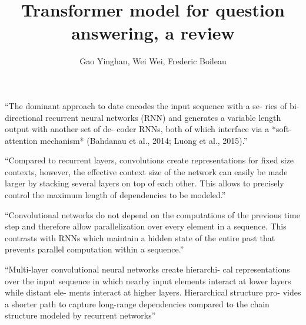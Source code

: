 \documentclass{article}
\title{\textbf{Transformer model for question answering, a review}}
\author{Gao Yinghan, Wei Wei, Frederic Boileau}
\begin{document}
\maketitle
\thispagestyle{plain}

``The dominant approach to date encodes the input sequence with a se- ries of
bi-directional recurrent neural networks (RNN) and generates a variable length
output with another set of de- coder RNNs, both of which interface via a
*soft-attention mechanism* (Bahdanau et al., 2014; Luong et al., 2015).''

``Compared to recurrent layers, convolutions create representations for fixed
size contexts, however, the effective context size of the network can easily
be made larger by stacking several layers on top of each other. This allows to
precisely control the maximum length of dependencies to be modeled.''

``Convolutional networks do not depend on the computations of the previous time
step and therefore allow parallelization over every element in a sequence.
This contrasts with RNNs which maintain a hidden state of the entire past that
prevents parallel computation within a sequence.''

``Multi-layer convolutional neural networks create hierarchi- cal representations
over the input sequence in which nearby input elements interact at lower layers
while distant ele- ments interact at higher layers. Hierarchical structure pro-
vides a shorter path to capture long-range dependencies compared to the chain
structure modeled by recurrent networks''\cite{gehring2017convolutional}

\medskip



\end{document}

